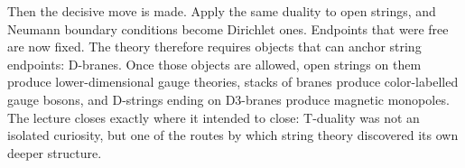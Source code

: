 Then the decisive move is made. Apply the same duality to open strings, and Neumann boundary conditions become Dirichlet ones. Endpoints that were free are now fixed. The theory therefore requires objects that can anchor string endpoints: D-branes. Once those objects are allowed, open strings on them produce lower-dimensional gauge theories, stacks of branes produce color-labelled gauge bosons, and D-strings ending on D3-branes produce magnetic monopoles. The lecture closes exactly where it intended to close: T-duality was not an isolated curiosity, but one of the routes by which string theory discovered its own deeper structure.
